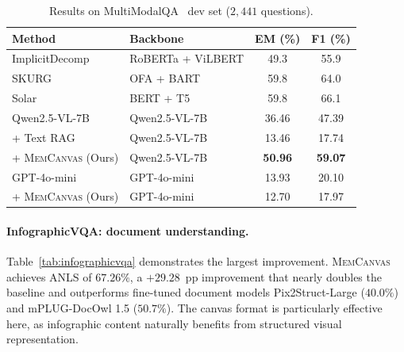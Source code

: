 \documentclass{article}
\newcommand{\memcanvas}{\textsc{MemCanvas}}
\begin{document}
\begin{table}[t]
  \centering
  \caption{Results on MultiModalQA~\citep{talmor2021multimodalqa} dev set ($2{,}441$ questions).}
  \label{tab:mmqa}
  \begin{tabular}{@{}llcc@{}}
    \toprule
    \textbf{Method} & \textbf{Backbone} & \textbf{EM (\%)} & \textbf{F1 (\%)} \\
    \midrule
    ImplicitDecomp~\citep{talmor2021multimodalqa} & RoBERTa + ViLBERT & 49.3 & 55.9 \\
    SKURG~\citep{yang2023skurg} & OFA + BART & 59.8 & 64.0 \\
    Solar~\citep{yu2023solar} & BERT + T5 & 59.8 & 66.1 \\
    \midrule
    Qwen2.5-VL-7B                 & Qwen2.5-VL-7B & 36.46 & 47.39 \\
    \;\;+ Text RAG                & Qwen2.5-VL-7B & 13.46 & 17.74 \\
    \;\;+ \memcanvas{} (Ours)     & Qwen2.5-VL-7B & \textbf{50.96} & \textbf{59.07} \\
    \midrule
    GPT-4o-mini                   & GPT-4o-mini & 13.93 & 20.10 \\
    \;\;+ \memcanvas{} (Ours)     & GPT-4o-mini & 12.70 & 17.97 \\
    \bottomrule
  \end{tabular}
\end{table}

\paragraph{InfographicVQA: document understanding.}
Table~\ref{tab:infographicvqa} demonstrates the largest improvement. \memcanvas{} achieves ANLS of $67.26\%$, a $+29.28$~pp improvement that nearly doubles the baseline and outperforms fine-tuned document models Pix2Struct-Large ($40.0\%$) and mPLUG-DocOwl 1.5 ($50.7\%$). The canvas format is particularly effective here, as infographic content naturally benefits from structured visual representation.
\end{document}
